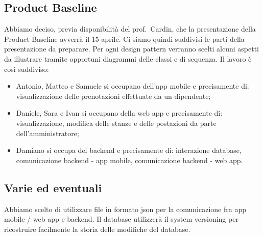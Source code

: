 \subsection*{Product Baseline}
Abbiamo deciso, previa disponibilità del prof.~Cardin, che la presentazione della Product Baseline avverrà il 15 aprile. Ci siamo quindi suddivisi le parti della presentazione da preparare. Per ogni design pattern verranno scelti alcuni aspetti da illustrare tramite opportuni diagrammi delle classi e di sequenza. Il lavoro è così suddiviso:
\begin{itemize}
	\item Antonio, Matteo e Samuele si occupano dell'app mobile e precisamente di: visualizzazione delle prenotazioni effettuate da un dipendente;
	\item Daniele, Sara e Ivan si occupano della web app e precisamente di: visualizzazione, modifica delle stanze e delle postazioni da parte dell'amministratore;
	\item Damiano si occupa del backend e precisamente di: interazione database, comunicazione backend - app mobile, comunicazione backend - web app.
\end{itemize} 

\subsection*{Varie ed eventuali}
Abbiamo scelto di utilizzare file in formato json per la comunicazione fra app mobile / web app e backend. Il database utilizzerà il system versioning per ricostruire facilmente la storia delle modifiche del database.